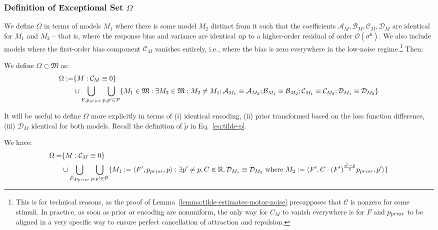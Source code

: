 \subsubsection{Definition of Exceptional Set $\Omega$}
We define $\Omega$ in terms of models $M_1$ where there is some model $M_2$ distinct from it such that the coefficients $\mathcal{A}_M, \mathcal{B}_M, \mathcal{C}_M, \mathcal{D}_M$ are identical for $M_1$ and $M_2$ -- that is, where the response bias and variance are identical up to a higher-order residual of order $\mathcal{O}(\sigma^6)$.
We also include models where the first-order bias component $\mathcal{C}_M$ vanishes entirely, i.e., where the bias is zero everywhere in the low-noise regime.\footnote{This is for technical reasons, as the proof of Lemma~\ref{lemma:tilde-estimates-motor-noise} presupposes that $\mathcal{C}$ is nonzero for some stimuli. In practice, as soon as prior or encoding are nonuniform, the only way for $C_M$ to vanish everywhere is for $F$ and $p_{prior}$ to be aligned in a very specific way to ensure perfect cancellation of attraction and repulsion.}
Then:
\begin{defin}
We define $\Omega \subset \mathfrak{M}$ as:  
\begin{align*}
\Omega := & \{M : \mathcal{C}_M \equiv 0\} \\
& \cup \bigcup_{F, p_{prior}} \bigcup_{p,p' \in \mathcal{P}} \{M_1 \in \mathfrak{M} : \exists M_2 \in \mathfrak{M} :  M_2 \neq M_1; \mathcal{A}_{M_1} \equiv \mathcal{A}_{M_2}; \mathcal{B}_{M_1} \equiv \mathcal{B}_{M_2}; \mathcal{C}_{M_1} \equiv \mathcal{C}_{M_2}; \mathcal{D}_{M_1} \equiv \mathcal{D}_{M_2}\}
\end{align*}
\end{defin}
It will be useful to define $\Omega$ more explicitly in terms of (i) identical encoding, (ii) prior transformed based on the loss function difference, (iii) $\mathcal{D}_M$ identical for both models.
Recall the definition of $\tilde{p}$ in Eq.~\ref{eq:tilde-p}.
\begin{lemma}
\label{lemma:model_existence}
We have:
\begin{align*}
\Omega = & \{M : \mathcal{C}_M \equiv 0\} \\
& \cup \bigcup_{F, p_{prior}} \bigcup_{p,p' \in \mathcal{P}} \{M_1 := \langle F',  p_{prior}, p\rangle : \exists p'\neq p, C \in \mathbb{R}, \mathcal{D}_{M_1} \equiv \mathcal{D}_{M_2} \text{ where } M_2 := \langle F', C \cdot (F')^{\frac{\tilde{p'}-\tilde{p}}{2}} p_{prior}, p'\rangle\}
\end{align*}
\end{lemma}
